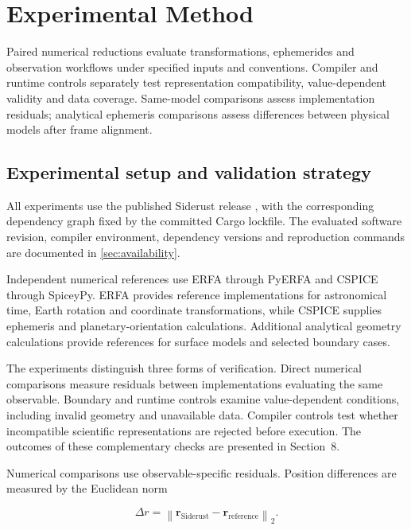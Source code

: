 
\section{Experimental Method}
\label{sec:evaluation}

Paired numerical reductions evaluate transformations, ephemerides and observation workflows under
specified inputs and conventions. Compiler and runtime controls separately test representation
compatibility, value-dependent validity and data coverage. Same-model comparisons assess
implementation residuals; analytical ephemeris comparisons assess differences between physical
models after frame alignment.

\subsection{Experimental setup and validation strategy}

All experiments use the published Siderust release \cite{Valles_Puig_Siderust_Type-Safe_Astronomy},
with the corresponding dependency graph fixed by the committed Cargo lockfile. The evaluated
software revision, compiler environment, dependency versions and reproduction commands are
documented in \ref{sec:availability}.

Independent numerical references use ERFA through PyERFA and CSPICE through SpiceyPy. ERFA provides
reference implementations for astronomical time, Earth rotation and coordinate transformations,
while CSPICE supplies ephemeris and planetary-orientation calculations. Additional analytical
geometry calculations provide references for surface models and selected boundary cases.

The experiments distinguish three forms of verification. Direct numerical comparisons measure
residuals between implementations evaluating the same observable. Boundary and runtime controls
examine value-dependent conditions, including invalid geometry and unavailable data. Compiler
controls test whether incompatible scientific representations are rejected before execution. The
outcomes of these complementary checks are presented in Section~8.

Numerical comparisons use observable-specific residuals. Position differences are measured by the
Euclidean norm

\begin{equation}
    \Delta r =
    \left\|
    \boldsymbol r_{\mathrm{Siderust}}
    -\boldsymbol r_{\mathrm{reference}}
    \right\|_2.
\end{equation}

